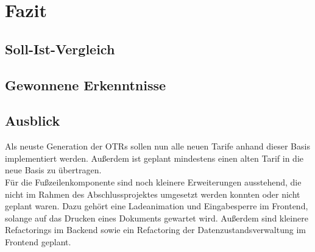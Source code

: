 \newpage
\section{Fazit}
\label{fazit}

\subsection{Soll-Ist-Vergleich}
\label{sollIstVgl}

\subsection{Gewonnene Erkenntnisse}
\label{erkenntnisse}

\subsection{Ausblick}
\label{ausblick}
Als neuste Generation der \ac{OTR}s sollen nun alle neuen Tarife anhand dieser Basis implementiert werden. Außerdem ist geplant mindestens einen alten Tarif in die neue Basis zu übertragen.\\
Für die Fußzeilenkomponente sind noch kleinere Erweiterungen ausstehend, die nicht im Rahmen des Abschlussprojektes umgesetzt werden konnten oder nicht geplant waren. Dazu gehört eine Ladeanimation und Eingabesperre im Frontend, solange auf das Drucken eines Dokuments gewartet wird. Außerdem sind kleinere Refactorings im Backend sowie ein Refactoring der Datenzustandsverwaltung im Frontend geplant.